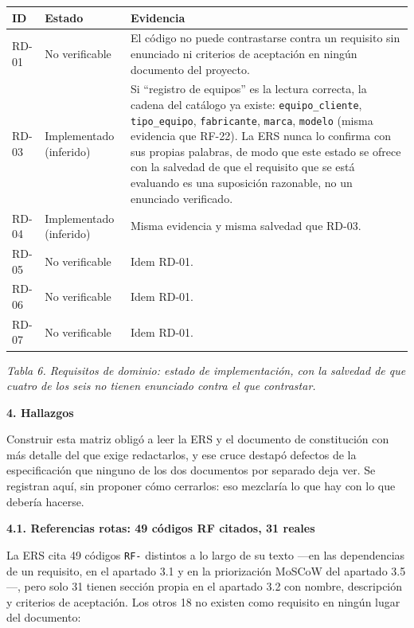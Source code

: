 \documentclass[12pt,varwidth=170mm,border=10pt]{standalone}
\newcommand{\sectiontitle}[1]{%
  \par\vspace{1.8ex}%
  {\normalfont\Large\bfseries #1\par}%
  \vspace{1.0ex}%
}
\newcommand{\subsectiontitle}[1]{%
  \par\vspace{1.3ex}%
  {\normalfont\large\bfseries #1\par}%
  \vspace{0.5ex}%
}
\newcommand{\tablecaption}[2]{%
  \par\vspace{0.4em}%
  \begin{center}
    \footnotesize\textit{Tabla #1. #2}
  \end{center}
  \vspace{1.0em}%
}
\begin{document}
\begingroup
\small
\begin{center}
\begin{tabular}{|p{1.5cm}|p{2.6cm}|p{9.9cm}|}
\hline
\textbf{ID} & \textbf{Estado} & \textbf{Evidencia} \\
\hline
RD-01 & No verificable & El código no puede contrastarse contra un requisito sin enunciado ni criterios de aceptación en ningún documento del proyecto. \\
\hline
RD-03 & Implementado \newline (inferido) & Si ``registro de equipos'' es la lectura correcta, la cadena del catálogo ya existe: \texttt{equipo\_cliente}, \texttt{tipo\_equipo}, \texttt{fabricante}, \texttt{marca}, \texttt{modelo} (misma evidencia que RF-22). La ERS nunca lo confirma con sus propias palabras, de modo que este estado se ofrece con la salvedad de que el requisito que se está evaluando es una suposición razonable, no un enunciado verificado. \\
\hline
RD-04 & Implementado \newline (inferido) & Misma evidencia y misma salvedad que RD-03. \\
\hline
RD-05 & No verificable & Idem RD-01. \\
\hline
RD-06 & No verificable & Idem RD-01. \\
\hline
RD-07 & No verificable & Idem RD-01. \\
\hline
\end{tabular}
\end{center}
\tablecaption{6}{Requisitos de dominio: estado de implementación, con la salvedad de que cuatro de los seis no tienen enunciado contra el que contrastar.}
\endgroup

\sectiontitle{4. Hallazgos}
\label{sec:hallazgos}

Construir esta matriz obligó a leer la ERS y el documento de constitución con más detalle del que exige redactarlos, y ese cruce destapó defectos de la especificación que ninguno de los dos documentos por separado deja ver. Se registran aquí, sin proponer cómo cerrarlos: eso mezclaría lo que hay con lo que debería hacerse.

\subsectiontitle{4.1. Referencias rotas: 49 códigos RF citados, 31 reales}

La ERS cita 49 códigos \texttt{RF-} distintos a lo largo de su texto —en las dependencias de un requisito, en el apartado 3.1 y en la priorización MoSCoW del apartado 3.5—, pero solo 31 tienen sección propia en el apartado 3.2 con nombre, descripción y criterios de aceptación. Los otros 18 no existen como requisito en ningún lugar del documento:
\end{document}
